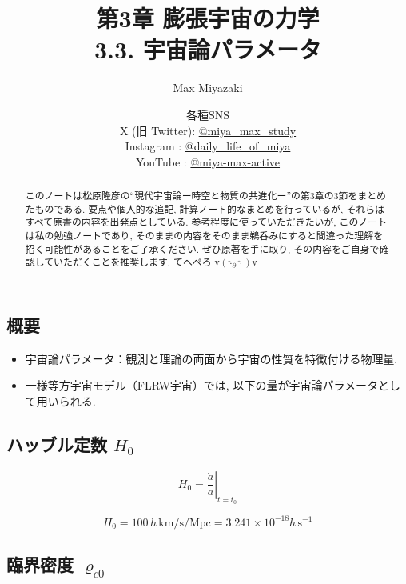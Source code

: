 \documentclass[a4paper,12pt]{article}
\title{第3章 膨張宇宙の力学\\
3.3. 宇宙論パラメータ}
\date{各種SNS\\
    X (旧 Twitter): \href{https://x.com/miya_max_study}{@miya\_max\_study}\\
    Instagram : \href{https://www.instagram.com/daily_life_of_miya/}{@daily\_life\_of\_miya}\\
    YouTube : \href{https://www.youtube.com/@miya-max-active}{@miya-max-active}
    }
\author{Max Miyazaki}
\begin{document}
\maketitle

\vspace{1cm}
\begin{abstract}
    このノートは松原隆彦の``現代宇宙論ー時空と物質の共進化ー''の第3章の3節をまとめたものである. 要点や個人的な追記, 計算ノート的なまとめを行っているが, それらはすべて原書の内容を出発点としている. 参考程度に使っていただきたいが, このノートは私の勉強ノートであり, そのままの内容をそのまま鵜呑みにすると間違った理解を招く可能性があることをご了承ください. ぜひ原著を手に取り, その内容をご自身で確認していただくことを推奨します. てへぺろ v$({\hat{\cdot}_\partial \hat{\cdot}})$v



\end{abstract}
    
    

\newpage

\color{blue}
\subsection*{概要}
\begin{itemize}

    \item 宇宙論パラメータ：観測と理論の両面から宇宙の性質を特徴付ける物理量.
    \item 一様等方宇宙モデル（FLRW宇宙）では, 以下の量が宇宙論パラメータとして用いられる.
  
  \end{itemize}
  
  \subsection*{ハッブル定数 $H_0$}
  
  \begin{equation*}
    H_0 = \left. \frac{\dot{a}}{a} \right|_{t = t_0}
  \end{equation*}
  
  \begin{equation*}
    H_0 = 100\, h\, \text{km/s/Mpc} = 3.241 \times 10^{-18} h\, \text{s}^{-1}
  \end{equation*}
  
  \subsection*{臨界密度 $\varrho_{c0}$}
  
\end{document}

